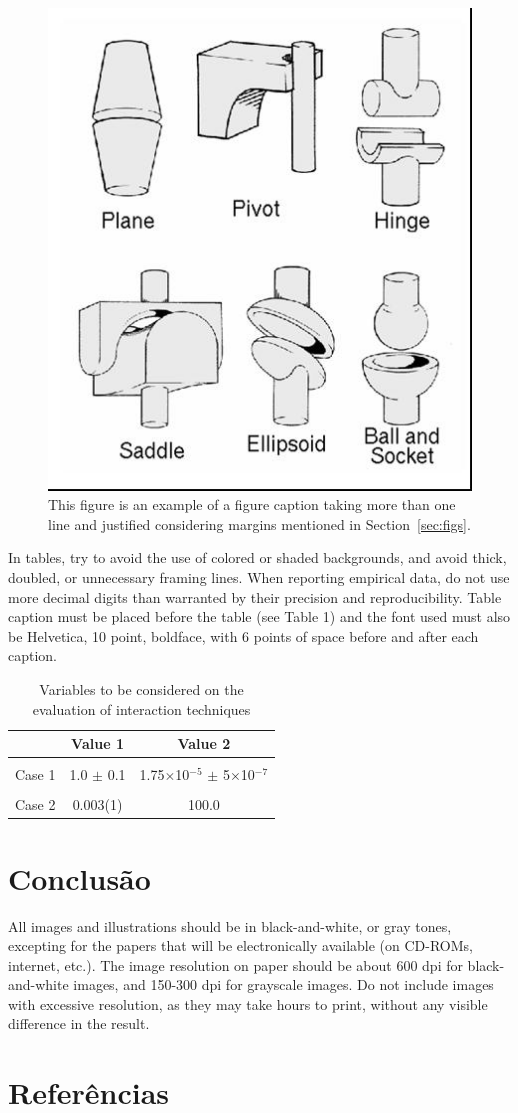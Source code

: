 \begin{document}
\begin{figure}[ht]
\centering
\includegraphics[width=.3\textwidth]{fig2.jpg}
\caption{This figure is an example of a figure caption taking more than one
  line and justified considering margins mentioned in Section~\ref{sec:figs}.}
\label{fig:exampleFig2}
\end{figure}

In tables, try to avoid the use of colored or shaded backgrounds, and avoid
thick, doubled, or unnecessary framing lines. When reporting empirical data,
do not use more decimal digits than warranted by their precision and
reproducibility. Table caption must be placed before the table (see Table 1)
and the font used must also be Helvetica, 10 point, boldface, with 6 points of
space before and after each caption.

\begin{table}[ht]
\centering
\caption{Variables to be considered on the evaluation of interaction
  techniques}
\label{tab:exTable1}
\smallskip
\begin{tabular}{|l|c|c|}
\hline
& Value 1 & Value 2\\[0.5ex]
\hline
&&\\[-2ex]
Case 1 & 1.0 $\pm$ 0.1 & 1.75$\times$10$^{-5}$ $\pm$ 5$\times$10$^{-7}$\\[0.5ex]
\hline
&&\\[-2ex]
Case 2 & 0.003(1) & 100.0\\[0.5ex]
\hline
\end{tabular}
\end{table}

\section{Conclusão} \label{sec:conclusao}

All images and illustrations should be in black-and-white, or gray tones,
excepting for the papers that will be electronically available (on CD-ROMs,
internet, etc.). The image resolution on paper should be about 600 dpi for
black-and-white images, and 150-300 dpi for grayscale images.  Do not include
images with excessive resolution, as they may take hours to print, without any
visible difference in the result. 

\section{Referências} \label{sec:referencias}



\end{document}
